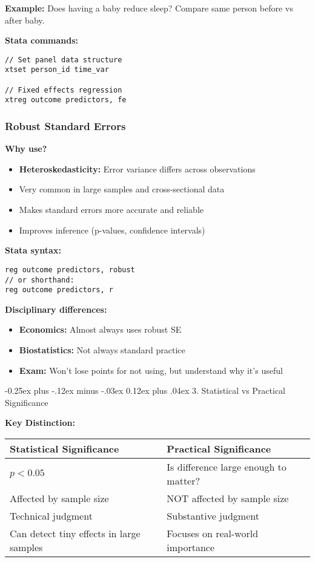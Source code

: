 ﻿\documentclass[8pt,letterpaper]{article}
\makeatletter
\renewcommand{\subsection}{\@startsection{subsection}{2}{0mm}%
                                {-0.25ex plus -.12ex minus -.03ex}%
                                {0.12ex plus .04ex}%
                                {\normalfont\fontsize{8pt}{8pt}\selectfont\bfseries\color{myblue}}}
\makeatother
\begin{document}
\begin{multicols}{2}
\textbf{Example:} Does having a baby reduce sleep? Compare same person before vs after baby.

\textbf{Stata commands:}
\begin{lstlisting}
// Set panel data structure
xtset person_id time_var

// Fixed effects regression
xtreg outcome predictors, fe
\end{lstlisting}

\subsubsection{Robust Standard Errors}

\textbf{Why use?}
\begin{itemize}
\item \textbf{Heteroskedasticity:} Error variance differs across observations
\item Very common in large samples and cross-sectional data
\item Makes standard errors more accurate and reliable
\item Improves inference (p-values, confidence intervals)
\end{itemize}

\textbf{Stata syntax:}
\begin{lstlisting}
reg outcome predictors, robust
// or shorthand:
reg outcome predictors, r
\end{lstlisting}

\textbf{Disciplinary differences:}
\begin{itemize}
\item \textbf{Economics:} Almost always uses robust SE
\item \textbf{Biostatistics:} Not always standard practice
\item \textbf{Exam:} Won't lose points for not using, but understand why it's useful
\end{itemize}

\subsection{3. Statistical vs Practical Significance}

\textbf{Key Distinction:}

\begin{center}
\fontsize{6.5pt}{7.5pt}\selectfont
\begin{tabular}{|p{3.2cm}|p{3.2cm}|}
\hline
\textbf{Statistical Significance} & \textbf{Practical Significance} \\
\hline
$p < 0.05$ & Is difference large enough to matter? \\
\hline
Affected by sample size & NOT affected by sample size \\
\hline
Technical judgment & Substantive judgment \\
\hline
Can detect tiny effects in large samples & Focuses on real-world importance \\
\hline
\end{tabular}
\end{center}


\end{multicols}
\end{document}
